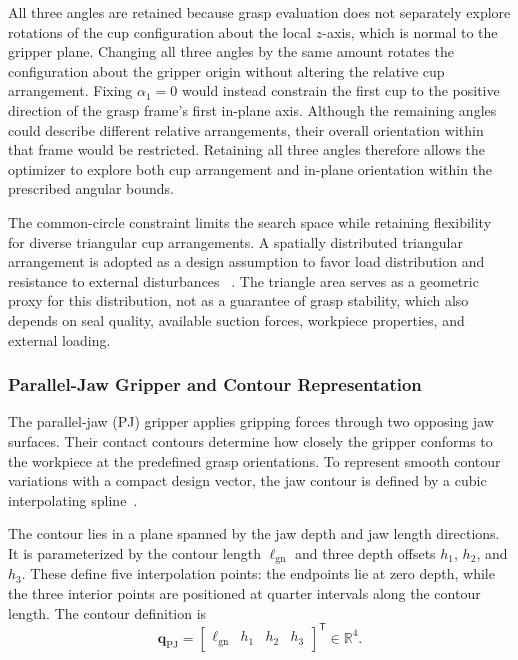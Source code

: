 All three angles are retained because grasp evaluation does not
separately explore rotations of the cup configuration about the local
\(z\)-axis, which is normal to the gripper plane. Changing all three
angles by the same amount rotates the configuration about the gripper
origin without altering the relative cup arrangement. Fixing
\(\alpha_1=0\) would instead constrain the first cup to the positive
direction of the grasp frame's first in-plane axis. Although the
remaining angles could describe different relative arrangements, their
overall orientation within that frame would be restricted. Retaining
all three angles therefore allows the optimizer to explore both cup
arrangement and in-plane orientation within the prescribed angular
bounds.

The common-circle constraint limits the search space while retaining
flexibility for diverse triangular cup arrangements. A spatially
distributed triangular arrangement is adopted as a design assumption
to favor load distribution and resistance to external disturbances ~\cite{Roa_Suarez_2015}.
The triangle area serves as a geometric proxy for this distribution,
not as a guarantee of grasp stability, which also depends on seal
quality, available suction forces, workpiece properties, and external
loading.

\subsubsection{Parallel-Jaw Gripper and Contour Representation}
\label{subsubsec:two_finger_theory}

The parallel-jaw (PJ) gripper applies gripping forces through two opposing jaw
surfaces. Their contact contours determine how closely the gripper conforms
to the workpiece at the predefined grasp orientations. To represent smooth
contour variations with a compact design vector, the jaw contour is defined
by a cubic interpolating spline~\cite{Liu2024Topology,Hasan2024B-spline,Chapelier2022Spline-based}.

The contour lies in a plane spanned by the jaw depth and jaw length
directions. It is parameterized by the contour length $\ell_{\mathrm{gn}}$
and three depth offsets $h_1$, $h_2$, and $h_3$. These define five
interpolation points: the endpoints lie at zero depth, while the three
interior points are positioned at quarter intervals along the contour
length. The contour definition is
\begin{equation}
\mathbf{q}_{\mathrm{PJ}}
=
\begin{bmatrix}
\ell_{\mathrm{gn}} & h_1 & h_2 & h_3
\end{bmatrix}^{\mathsf{T}}
\in\mathbb{R}^4.
\end{equation}

